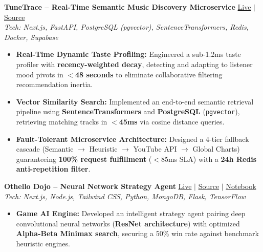 \documentclass[10pt, a4paper]{article}
\begin{document}
\vspace{0.09ex}
\noindent
\textbf{TuneTrace -- Real-Time Semantic Music Discovery Microservice} \hfill \href{https://tune-trace-iota.vercel.app/app}{\faLink{} Live} $|$ \href{https://github.com/Agrannya-Singh/Tune_Trace_backend}{\faGithub{} Source} \\
\textit{Tech: Next.js, FastAPI, PostgreSQL (pgvector), SentenceTransformers, Redis, Docker, Supabase}
\begin{itemize}
    \item \textbf{Real-Time Dynamic Taste Profiling:} Engineered a sub-1.2ms taste profiler with \textbf{recency-weighted decay}, detecting and adapting to listener mood pivots in \textbf{$<$48 seconds} to eliminate collaborative filtering recommendation inertia.
    \item \textbf{Vector Similarity Search:} Implemented an end-to-end semantic retrieval pipeline using \textbf{SentenceTransformers} and \textbf{PostgreSQL} (\texttt{pgvector}), retrieving matching tracks in \textbf{$<$45ms} via cosine distance queries.
    \item \textbf{Fault-Tolerant Microservice Architecture:} Designed a 4-tier fallback cascade (Semantic $\to$ Heuristic $\to$ YouTube API $\to$ Global Charts) guaranteeing \textbf{100\% request fulfillment} ($<$85ms SLA) with a \textbf{24h Redis anti-repetition filter}.
\end{itemize}

\vspace{0.09ex}
\noindent
\textbf{Othello Dojo -- Neural Network Strategy Agent} \hfill \href{https://othello-dojo.vercel.app/}{\faLink{} Live} $|$ \href{https://github.com/Agrannya-Singh/Othello-Dojo}{\faGithub{} Source} $|$ \href{https://www.kaggle.com/code/agrannyasingh/othello-v3/notebook}{\faKaggle{} Notebook} \\
\textit{Tech: Next.js, Node.js, Tailwind CSS, Python, MongoDB, Flask, TensorFlow}
\begin{itemize}
    \item \textbf{Game AI Engine:} Developed an intelligent strategy agent pairing deep convolutional neural networks (\textbf{ResNet architecture}) with optimized \textbf{Alpha-Beta Minimax search}, securing a 50\% win rate against benchmark heuristic engines.
\end{itemize}
\end{document}
